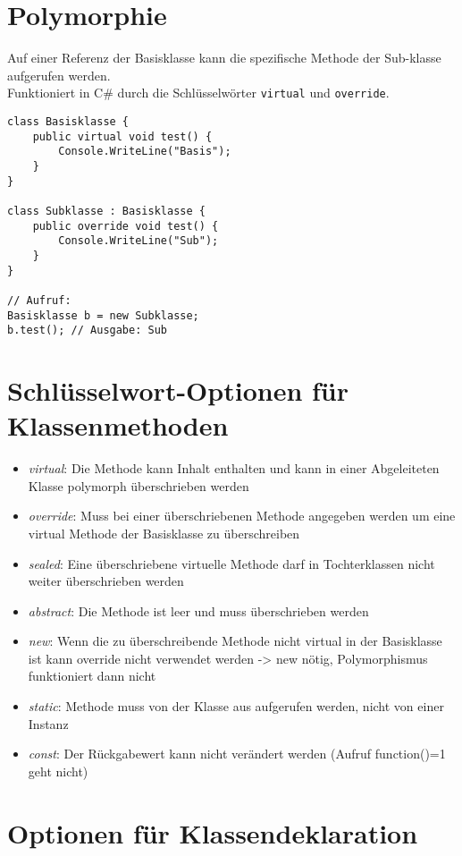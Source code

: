 \section{Polymorphie}
Auf einer Referenz der Basisklasse kann die spezifische Methode der Sub-klasse aufgerufen werden.\\
Funktioniert in C\# durch die Schlüsselwörter \lstinline$virtual$ und \lstinline$override$. 
\begin{lstlisting}[language={[Sharp]C}]
class Basisklasse { 
	public virtual void test() { 
		Console.WriteLine("Basis"); 
	} 
} 

class Subklasse : Basisklasse { 
	public override void test() { 
		Console.WriteLine("Sub"); 
	} 
} 

// Aufruf:
Basisklasse b = new Subklasse; 
b.test(); // Ausgabe: Sub
\end{lstlisting}

\section{Schlüsselwort-Optionen für Klassenmethoden}

\begin{itemize}
\item \emph{virtual}: Die Methode kann Inhalt enthalten und kann in einer Abgeleiteten Klasse polymorph überschrieben werden
\item \emph{override}: Muss bei einer überschriebenen Methode angegeben werden um eine virtual Methode der Basisklasse zu überschreiben
\item \emph{sealed}: Eine überschriebene virtuelle Methode darf in Tochterklassen nicht weiter überschrieben werden
\item \emph{abstract}: Die Methode ist leer und muss überschrieben werden
\item \emph{new}: Wenn die zu überschreibende Methode nicht virtual in der Basisklasse ist kann override nicht verwendet werden -{\textgreater} new nötig, Polymorphismus funktioniert dann nicht
\item \emph{static}: Methode muss von der Klasse aus aufgerufen werden, nicht von einer Instanz
\item \emph{const}: Der Rückgabewert kann nicht verändert werden (Aufruf function()=1 geht nicht)
\end{itemize}

\section{Optionen für Klassendeklaration}

